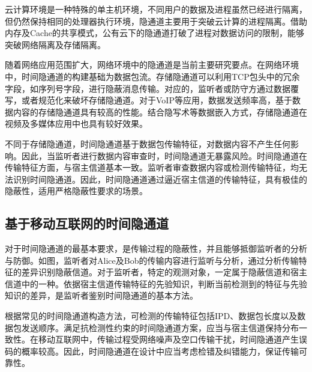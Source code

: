 云计算环境是一种特殊的单主机环境，不同用户的数据及进程虽然已经进行隔离，但仍然保持相同的处理器执行环境，隐通道主要用于突破云计算的进程隔离。借助内存及Cache的共享模式，公有云下的隐通道打破了进程对数据访问的限制，能够突破网络隔离及存储隔离。

随着网络应用范围扩大，网络环境中的隐通道是当前主要研究要点。在网络环境中，时间隐通道的构建基础为数据包流。存储隐通道可以利用TCP包头中的冗余字段，如序列号字段，进行隐蔽消息传输。对应的，监听者或防守方通过数据覆写，或者规范化来破坏存储隐通道。对于VoIP等应用，数据发送频率高，基于数据内容的存储隐通道具有较高的性能。结合隐写术等数据嵌入方式，存储隐通道在视频及多媒体应用中也具有较好效果。

不同于存储隐通道，时间隐通道基于数据包传输特征，对数据内容不产生任何影响。因此，当监听者进行数据内容审查时，时间隐通道无暴露风险。时间隐通道在传输特征方面，与宿主信道基本一致。监听者审查数据内容或检测传输特征，均无法识别时间隐通道。因此，时间隐通道通过逼近宿主信道的传输特征，具有极佳的隐蔽性，适用严格隐蔽性要求的场景。

\subsection{基于移动互联网的时间隐通道}
\label{sec:intro:background:ctc}

对于时间隐通道的最基本要求，是传输过程的隐蔽性，并且能够抵御监听者的分析与防御。如图，监听者对Alice及Bob的传输内容进行监听与分析，通过分析传输特征的差异识别隐蔽信道。对于监听者，特定的观测对象，一定属于隐蔽信道和宿主信道中的一种。依据宿主信道传输特征的先验知识，判断当前检测到的特征与先验知识的差异，是监听者鉴别时间隐通道的基本方法。

根据常见的时间隐通道构造方法，可检测的传输特征包括IPD、数据包长度以及数据包发送顺序。满足抗检测性约束的时间隐通道方案，应当与宿主信道保持分布一致性。在移动互联网中，传输过程受网络噪声及空口传输干扰，时间隐通道产生误码的概率较高。因此，时间隐通道在设计中应当考虑检错及纠错能力，保证传输可靠性。

